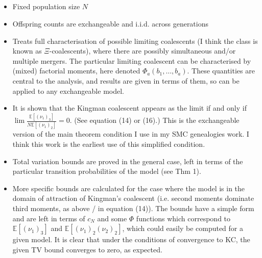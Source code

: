 \documentclass{article}
\newcommand{\E}{\mathbb{E}}
\begin{document}
\subsection*{\cite{mohle2000}}
\begin{itemize}
\item Fixed population size $N$
\item Offspring counts are exchangeable and i.i.d. across generations
\item Treats full characterisation of possible limiting coalescents (I think the class is known as $\Xi$-coalescents), where there are possibly simultaneous and/or multiple mergers. The particular limiting coalescent can be characterised by (mixed) factorial moments, here denoted $\Phi_a(b_1,\dots,b_a)$. These quantities are central to the analysis, and results are given in terms of them, so can be applied to any exchangeable model.
\item It is shown that the Kingman coalescent appears as the limit if and only if $ \lim \frac{\E[(\nu_1)_3]}{N\E[(\nu_1)_2]} =0$. (See equation (14) or (16).) This is the exchangeable version of the main theorem condition I use in my SMC genealogies work. I think this work is the earliest use of this simplified condition.
\item Total variation bounds are proved in the general case, left in terms of the particular transition probabilities of the model (see Thm 1).
\item More specific bounds are calculated for the case where the model is in the domain of attraction of Kingman's coalescent (i.e. second moments dominate third moments, as above / in equation (14)). The bounds have a simple form and are left in terms of $c_N$ and some $\Phi$ functions which correspond to $\E[(\nu_1)_3]$ and $\E[(\nu_1)_2(\nu_2)_2]$, which could easily be computed for a given model. It is clear that under the conditions of convergence to KC, the given TV bound converges to zero, as expected.
\end{itemize}
\end{document}
